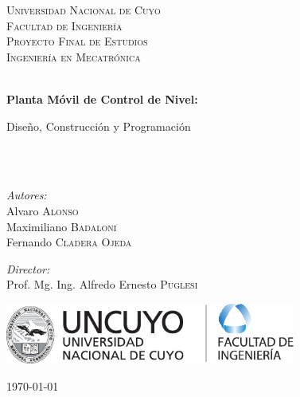 \begin{titlepage}

\begin{center}


\textsc{\LARGE Universidad Nacional de Cuyo}\\[1.5cm]
\textsc{\LARGE Facultad de Ingeniería}\\[1.5cm]

\textsc{\Large Proyecto Final de Estudios}\\[0.5cm]
\textsc{\Large Ingeniería en Mecatrónica }\\[0.5cm]

\HRule \\[0.4cm]
{ \huge \bfseries Planta Móvil de Control de Nivel:

Diseño, Construcción y Programación}\\[0.4cm]

\HRule \\[1.5cm]

\begin{minipage}{0.4\textwidth}
\begin{flushleft} \large
\emph{Autores:}\\
Alvaro \textsc{Alonso} \\
Maximiliano \textsc{Badaloni} \\
Fernando \textsc{Cladera Ojeda}
\end{flushleft}
\end{minipage}
\begin{minipage}{0.4\textwidth}
\begin{flushright} \large
\emph{Director:} \\
Prof. Mg. Ing. Alfredo Ernesto \textsc{Puglesi}
\end{flushright}
\end{minipage}

\vfill

\begin{minipage}[c]{0.9\textwidth}
  \centering
  \includegraphics[height=20mm]{Caratula/Logos/LogoFacu.pdf}
\end{minipage}

\vspace{1cm}

{\large \today}

\end{center}

\end{titlepage}
